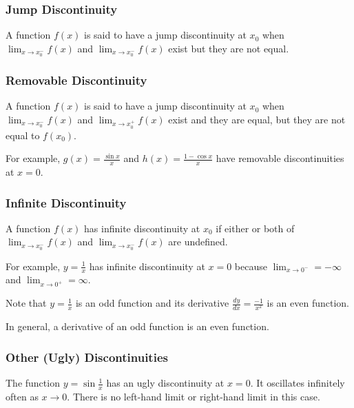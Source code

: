 \subsubsection{Jump Discontinuity}

A function \( f(x) \) is said to have a jump discontinuity at \( x_0 \)
when \( \lim_{x \to x_0^-} f(x) \) and \( \lim_{x \to x_0^-} f(x) \)
exist but they are not equal.


\subsubsection{Removable Discontinuity}

A function \( f(x) \) is said to have a jump discontinuity at \( x_0 \)
when \( \lim_{x \to x_0^-} f(x) \) and \( \lim_{x \to x_0^+} f(x) \)
exist and they are equal, but they are not equal to \( f(x_0) \).

For example, \( g(x) = \frac{\sin x}{x} \) and \( h(x) = \frac{1 - \cos
x}{x} \) have removable discontinuities at \( x = 0 \).


\subsubsection{Infinite Discontinuity}

A function \( f(x) \) has infinite discontinuity at \( x_0 \) if either or both
of \( \lim_{x \to x_0^-} f(x) \) and \( \lim_{x \to x_0^-} f(x) \) are
undefined.

For example, \( y = \frac{1}{x} \) has infinite discontinuity at \( x =
0 \) because \( \lim_{x \to 0^-} = -\infty \) and \( \lim_{x \to 0^+} =
\infty \).

Note that \( y = \frac{1}{x} \) is an odd function and its derivative \(
\frac{dy}{dx} = \frac{-1}{x^2} \) is an even function.

In general, a derivative of an odd function is an even function.


\subsubsection{Other (Ugly) Discontinuities}

The function \( y = \sin \frac{1}{x} \) has an ugly discontinuity at \(
x = 0 \). It oscillates infinitely often as \( x \to 0 \). There is no
left-hand limit or right-hand limit in this case.


